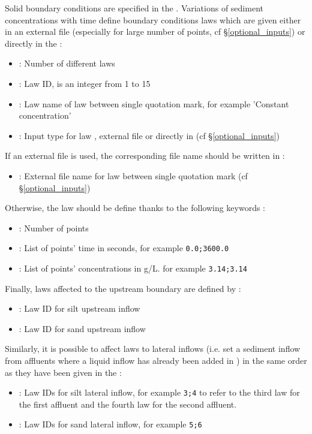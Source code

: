 Solid boundary conditions are specified in the \cas. Variations of sediment concentrations with time define boundary conditions laws which are given either in an external file (especially for large number of points, cf \S \ref{optional_inputs}) or directly in the \cas :
\begin{itemize}
	\item {} : Number of different laws
	\item {} : Law ID,  is an integer from 1 to 15
	\item {} : Law name of law  between single quotation mark, for example 'Constant concentration'
	\item {} : Input type for law , external file  or directly in \cas {} (cf \S \ref{optional_inputs})
\end{itemize}

If an external file is used, the corresponding file name should be written in :
\begin{itemize}
	\item {} : External file name for law  between single quotation mark (cf \S \ref{optional_inputs})
\end{itemize}

Otherwise, the law  should be define thanks to the following keywords :
\begin{itemize}
	\item {} : Number of points
	\item {} : List of points' time in seconds, for example \verb|0.0;3600.0|
	\item {} : List of points' concentrations in g/L. for example \verb|3.14;3.14|
\end{itemize}

Finally, laws affected to the upstream boundary are defined by :
\begin{itemize}
	\item {} : Law ID for silt upstream inflow
	\item {} : Law ID for sand upstream inflow
\end{itemize}

Similarly, it is possible to affect laws to lateral inflows (i.e. set a sediment inflow from affluents where a liquid inflow has already been added in \mascaret) in the same order as they have been given in the \xcas:
\begin{itemize}
	\item {} : Law IDs for silt lateral inflow, for example \verb|3;4| to refer to the third law for the first affluent and the fourth law for the second affluent.
	\item {}: Law IDs for sand lateral inflow, for example \verb|5;6|
\end{itemize}

